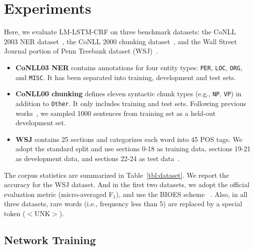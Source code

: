 \documentclass[letterpaper]{article} %
\newcommand{\our}{\textsc{LM-LSTM-CRF}\xspace}
\begin{document}
\section{Experiments}
\label{sect:exp}

Here, we evaluate \our on three benchmark datasets: the CoNLL 2003 NER dataset~\cite{tjong2003introduction}, the CoNLL 2000 chunking dataset~\cite{tjong2000introduction}, and the Wall Street Journal portion of Penn Treebank dataset (WSJ)~\cite{marcus1993building}.
\begin{itemize}[noitemsep,nolistsep]
\item \textbf{CoNLL03 NER} contains annotations for four entity types: \texttt{PER}, \texttt{LOC}, \texttt{ORG}, and \texttt{MISC}. It has been separated into training, development and test sets.
\item \textbf{CoNLL00 chunking} defines eleven syntactic chunk types (e.g., \texttt{NP}, \texttt{VP}) in addition to \texttt{Other}. It only includes training and test sets. Following previous works~\cite{peters2017semi}, we sampled 1000 sentences from training set as a held-out development set.
\item \textbf{WSJ} contains 25 sections and categorizes each word into 45 POS tags. We adopt the standard split and use sections 0-18 as training data, sections 19-21 as development data, and sections 22-24 as test data~\cite{manning2011part}.
\end{itemize}

The corpus statistics are summarized in Table~\ref{tbl:dataset}. 
We report the accuracy for the WSJ dataset.
And in the first two datasets, we adopt the official evaluation metric (micro-averaged F$_1$), and use the BIOES scheme
~\cite{ratinov2009design}.
Also, in all three datasets, rare words (i.e., frequency less than 5) are replaced by a special token ($<$UNK$>$).

\subsection{Network Training}
\end{document}
